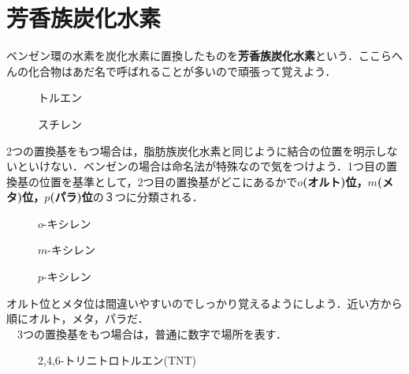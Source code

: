 \documentclass[a4paper,12pt]{ltjsreport}
\begin{document}
\section{芳香族炭化水素}
ベンゼン環の水素を炭化水素に置換したものを{\color{red}\textbf{芳香族炭化水素}}という．ここらへんの化合物はあだ名で呼ばれることが多いので頑張って覚えよう．\\
\begin{minipage}{0.5\linewidth}
\begin{figure}[H]
    \centering
\caption{トルエン} 
\end{figure}
\end{minipage}
\begin{minipage}{0.5\linewidth}
\begin{figure}[H]
    \centering
\caption{スチレン} 
\end{figure}
\end{minipage}
2つの置換基をもつ場合は，脂肪族炭化水素と同じように結合の位置を明示しないといけない．ベンゼンの場合は命名法が特殊なので気をつけよう．1つ目の置換基の位置を基準として，2つ目の置換基がどこにあるかで{\color{red}\textbf{$o$(オルト)位，$m$(メタ)位，$p$(パラ)位}}の３つに分類される．\\
\begin{minipage}{0.33\linewidth}
\begin{figure}[H]
    \centering
\caption{$o$-キシレン} 
\end{figure}
\end{minipage}
\begin{minipage}{0.33\linewidth}
\begin{figure}[H]
    \centering
\caption{$m$-キシレン} 
\end{figure}
\end{minipage}
\begin{minipage}{0.33\linewidth}
\begin{figure}[H]
    \centering
\caption{$p$-キシレン} 
\end{figure}
\end{minipage}
オルト位とメタ位は間違いやすいのでしっかり覚えるようにしよう．近い方から順にオルト，メタ，パラだ．\\
　3つの置換基をもつ場合は，普通に数字で場所を表す．\\
\begin{figure}[H]
    \centering
       \caption{2,4,6-トリニトロトルエン(TNT)}
\end{figure}
\end{document}
